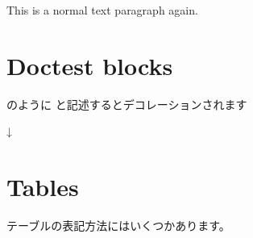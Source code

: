 \documentclass[letterpaper,10pt,dvipdfmx,openany,oneside]{sphinxmanual}
\begin{document}
This is a normal text paragraph again.


\section{Doctest blocks}
\label{\detokenize{source/1.chapter/basic_syntax:doctest-blocks}}
%
\begin{sphinxVerbatim}[commandchars=\\\{\}]
  
\end{sphinxVerbatim}

のように \sphinxstylestrong{\textgreater{}\textgreater{}\textgreater{}} と記述するとデコレーションされます

↓

%
\begin{sphinxVerbatim}[commandchars=\\\{\}]
  
\end{sphinxVerbatim}


\section{Tables}
\label{\detokenize{source/1.chapter/basic_syntax:tables}}
テーブルの表記方法にはいくつかあります。
\end{document}
